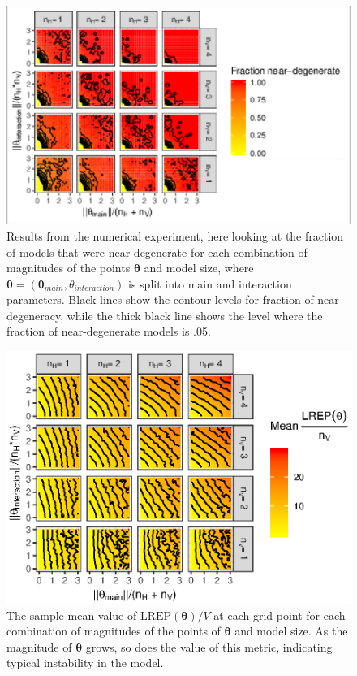 \documentclass[]{article}
\theoremstyle{definition}
\begin{document}
\par
\begin{figure}
\includegraphics{paper_files/figure-latex/degen-plots-1} \caption{Results from the numerical experiment, here looking at the fraction of models that were near-degenerate for each combination of magnitudes of the points $\boldsymbol \theta$ and model size, where $\boldsymbol \theta = (\boldsymbol \theta_{main}, \theta_{interaction})$ is split into main and interaction parameters. Black lines show the contour levels for fraction of near-degeneracy, while the thick black line shows the level where the fraction of near-degenerate models is .05.}\label{fig:degen-plots}
\end{figure}
\begin{figure}
\includegraphics{paper_files/figure-latex/instab-plots-1} \caption{The sample mean value of $\text{LREP}(\boldsymbol \theta)/V$ at each grid point for each combination of magnitudes of the points of $\boldsymbol \theta$ and model size. As the magnitude of $\boldsymbol \theta$ grows, so does the value of this metric, indicating typical instability in the model.}\label{fig:instab-plots}
\end{figure}
\end{document}

